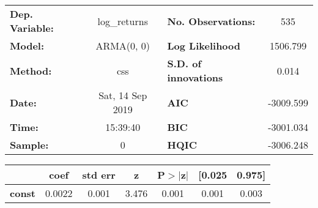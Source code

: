 \begin{center}
\begin{tabular}{lclc}
\toprule
\textbf{Dep. Variable:} &   log\_returns   & \textbf{  No. Observations:  } &    535      \\
\textbf{Model:}         &    ARMA(0, 0)    & \textbf{  Log Likelihood     } &  1506.799   \\
\textbf{Method:}        &       css        & \textbf{  S.D. of innovations} &   0.014     \\
\textbf{Date:}          & Sat, 14 Sep 2019 & \textbf{  AIC                } & -3009.599   \\
\textbf{Time:}          &     15:39:40     & \textbf{  BIC                } & -3001.034   \\
\textbf{Sample:}        &        0         & \textbf{  HQIC               } & -3006.248   \\
\bottomrule
\end{tabular}
\begin{tabular}{lcccccc}
               & \textbf{coef} & \textbf{std err} & \textbf{z} & \textbf{P$> |$z$|$} & \textbf{[0.025} & \textbf{0.975]}  \\
\midrule
\textbf{const} &       0.0022  &        0.001     &     3.476  &         0.001        &        0.001    &        0.003     \\
\bottomrule
\end{tabular}
\end{center}
